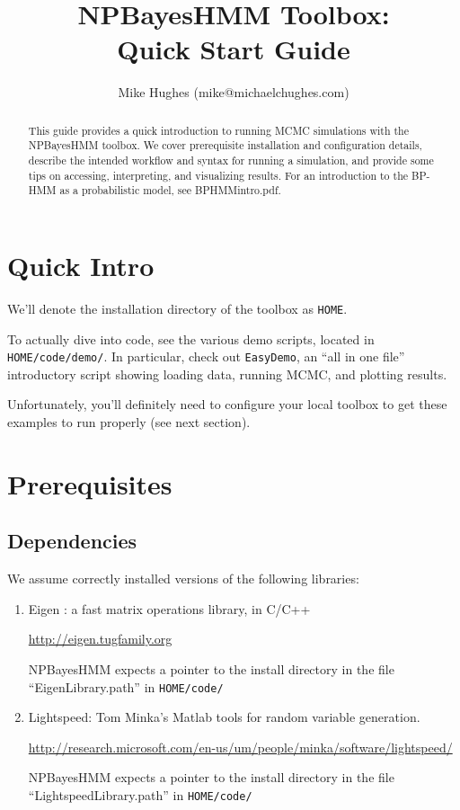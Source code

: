 \documentclass[fontsize=12]{article}
\title{ NPBayesHMM Toolbox:\\ Quick Start Guide}
\author{ Mike Hughes (mike@michaelchughes.com) }
\begin{document}
\maketitle

\begin{abstract}
This guide provides a quick introduction to running MCMC simulations with the NPBayesHMM toolbox. We cover prerequisite installation and configuration details, describe the intended workflow and syntax for running a simulation, and  provide some tips on accessing, interpreting, and visualizing results.  For an introduction to the BP-HMM as a probabilistic model, see BPHMMintro.pdf.
\end{abstract}

\section{ Quick Intro }

We'll denote the installation directory of the toolbox as \texttt{HOME}. 

To actually dive into code, see the various demo scripts, located in \texttt{HOME/code/demo/}.  In particular, check out \texttt{EasyDemo}, an ``all in one file'' introductory script showing loading data, running MCMC, and plotting results.

Unfortunately, you'll definitely need to configure your local toolbox to get these examples to run properly (see next section).

\section{ Prerequisites}
\subsection{ Dependencies}
We assume correctly installed versions of the following libraries:

\begin{enumerate}
\item Eigen : a fast matrix operations library, in C/C++

\url{http://eigen.tugfamily.org}

NPBayesHMM expects a pointer to the install directory in the file ``EigenLibrary.path'' in \texttt{HOME/code/}

\item Lightspeed: Tom Minka's Matlab tools for random variable generation.

\url{http://research.microsoft.com/en-us/um/people/minka/software/lightspeed/}

NPBayesHMM expects a pointer to the install directory in the file ``LightspeedLibrary.path'' in \texttt{HOME/code/}

\end{enumerate}
\end{document}
